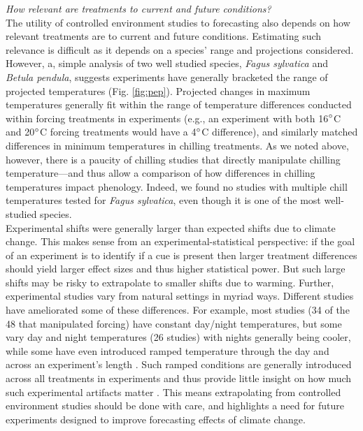\documentclass[11pt,letter]{article}
\begin{document}
\emph{How relevant are treatments to current and future conditions?}\\
The utility of controlled environment studies to forecasting also depends on how relevant treatments are to current and future conditions. Estimating such relevance is difficult as it depends on a species' range and projections considered. However, a, simple analysis of two well studied species, \emph{Fagus sylvatica} and \emph{Betula pendula}, suggests experiments have generally bracketed the range of projected temperatures (Fig. \ref{fig:pep}). Projected changes in maximum temperatures generally fit within the range of temperature differences conducted within forcing treatments in experiments (e.g., an experiment with both 16$\degree$C  and 20$\degree$C forcing treatments would have a 4$\degree$C difference), and similarly matched differences in minimum temperatures in chilling treatments. As we noted above, however, there is a paucity of chilling studies that directly manipulate chilling temperature---and thus allow a comparison of how differences in chilling temperatures impact phenology. Indeed, we found no studies with multiple chill temperatures tested for \emph{Fagus sylvatica}, even though it is one of the most well-studied species. \\

Experimental shifts were generally larger than expected shifts due to climate change. This makes sense from an experimental-statistical perspective: if the goal of an experiment is to identify if a cue is present then larger treatment differences should yield larger effect sizes and thus higher statistical power. But such large shifts may be risky to extrapolate to smaller shifts due to warming. Further, experimental studies vary from natural settings in myriad ways. Different studies have ameliorated some of these differences. For example, most studies (34 of the 48 that manipulated forcing) have constant day/night temperatures, but some vary day and night temperatures (26 studies) with nights generally being cooler, while some have even introduced ramped temperature through the day and across an experiment's length \citep[e.g.,][]{Basler:2012,Laube:2014a}. Such ramped conditions are generally introduced across all treatments in experiments and thus provide little insight on how much such experimental artifacts matter \citep[but see][]{erwin1995}. This means extrapolating from controlled environment studies should be done with care, and highlights a need for future experiments designed to improve forecasting effects of climate change. 
\end{document}
